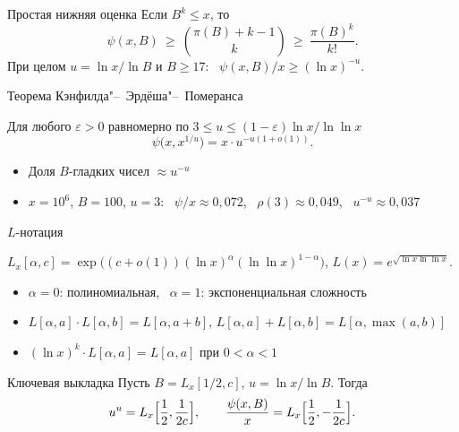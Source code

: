 \documentclass{ca-slides}
\begin{document}
\begin{theoremframe}[proposition]{Простая нижняя оценка}
  Если $B^k \le x$, то
  \[
    \psi(x, B) \ \ge\ \binom{\pi(B) + k - 1}{k} \ \ge\ \frac{\pi(B)^k}{k!}.
  \]
  При целом $u = \ln x / \ln B$ и $B \ge 17$: \ $\psi(x, B)/x \ge (\ln x)^{-u}$.
\end{theoremframe}

\begin{canvasframe}{Теорема Кэнфилда"--~Эрдёша"--~Померанса}
  \begin{theorem}
    Для любого $\varepsilon > 0$ равномерно по $3 \le u \le (1 - \varepsilon)\ln x / \ln\ln x$
    \[
      \psi\bigl(x, x^{1/u}\bigr) = x \cdot u^{-u(1 + o(1))}.
    \]
  \end{theorem}
  \begin{itemize}
    \item Доля $B$-гладких чисел $\approx u^{-u}$
    \item $x = 10^6$, $B = 100$, $u = 3$: \ $\psi/x \approx 0{,}072$, \ $\rho(3) \approx 0{,}049$,
      \ $u^{-u} \approx 0{,}037$
  \end{itemize}
\end{canvasframe}

\begin{canvasframe}{$L$-нотация}
  \begin{definition}
    $L_x[\alpha, c] = \exp\bigl((c + o(1))(\ln x)^{\alpha}(\ln\ln x)^{1 - \alpha}\bigr)$,
    \quad $L(x) = e^{\sqrt{\ln x \ln\ln x}}$.
  \end{definition}
  \begin{itemize}
    \item $\alpha = 0$: полиномиальная, \ $\alpha = 1$: экспоненциальная сложность
    \item $L[\alpha, a] \cdot L[\alpha, b] = L[\alpha, a + b]$, \quad
      $L[\alpha, a] + L[\alpha, b] = L[\alpha, \max(a, b)]$
    \item $(\ln x)^k \cdot L[\alpha, a] = L[\alpha, a]$ при $0 < \alpha < 1$
  \end{itemize}
  \notearea[0.25\textheight]
\end{canvasframe}

\begin{theoremframe}[lemma]{Ключевая выкладка}
  Пусть $B = L_x[1/2, c]$, $u = \ln x / \ln B$. Тогда
  \[
    u^u = L_x\Bigl[\frac12, \frac{1}{2c}\Bigr], \qquad
    \frac{\psi(x, B)}{x} = L_x\Bigl[\frac12, -\frac{1}{2c}\Bigr].
  \]
\end{theoremframe}
\end{document}
